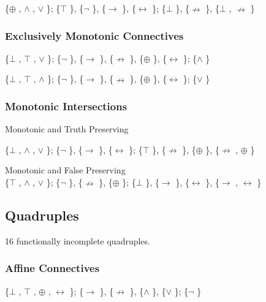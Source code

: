 \{$\oplus$ , $\land$ , $\lor$ \}; \{$\top$ \}, \{$\neg$ \}, \{$\to$ \}, \{$\leftrightarrow$ \}; \{$\bot$ \}, \{$\nrightarrow$ \}, \{$\bot$ , $\nrightarrow$ \}

\hypertarget{exclusively-monotonic-connectives}{%
\subsubsection{\texorpdfstring{Exclusively Monotonic Connectives
}{Exclusively Monotonic Connectives }}\label{exclusively-monotonic-connectives}}

\{$\bot$ , $\top$ , $\lor$ \}; \{$\neg$ \}, \{$\to$ \}, \{$\nrightarrow$ \}, \{$\oplus$ \}, \{$\leftrightarrow$ \}; \{$\land$ \}

\{$\bot$ , $\top$ , $\land$ \}; \{$\neg$ \}, \{$\to$ \}, \{$\nrightarrow$ \}, \{$\oplus$ \}, \{$\leftrightarrow$ \}; \{$\lor$ \}

\hypertarget{monotonic-intersections}{%
\subsubsection{Monotonic Intersections}\label{monotonic-intersections}}

Monotonic and Truth Preserving

\{$\bot$ , $\land$ , $\lor$ \}; \{$\neg$ \}, \{$\to$ \}, \{$\leftrightarrow$ \}; \{$\top$ \}, \{$\nrightarrow$ \}, \{$\oplus$ \}, \{$\nrightarrow$ , $\oplus$ \}

Monotonic and False Preserving\\
\{$\top$ , $\land$ , $\lor$ \}; \{$\neg$ \}, \{$\nrightarrow$ \}, \{$\oplus$ \}; \{$\bot$ \}, \{$\to$ \}, \{$\leftrightarrow$ \}, \{$\to$ , $\leftrightarrow$ \}

\hypertarget{quadruples}{%
\subsection{Quadruples}\label{quadruples}}

16 functionally incomplete quadruples.

\hypertarget{affine-connectives-1}{%
\subsubsection{Affine Connectives}\label{affine-connectives-1}}

\{$\bot$ , $\top$ , $\oplus$ , $\leftrightarrow$ \}; \{$\to$ \}, \{$\nrightarrow$ \}, \{$\land$ \}, \{$\lor$ \}; \{$\neg$ \}

